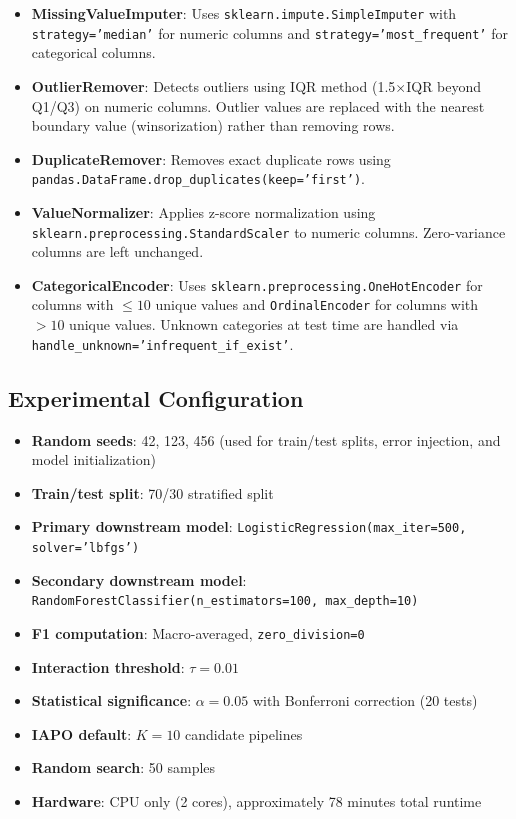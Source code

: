 \documentclass[preprint]{article}
\begin{document}
\begin{itemize}[nosep]
\item \textbf{MissingValueImputer}: Uses \texttt{sklearn.impute.SimpleImputer} with \texttt{strategy='median'} for numeric columns and \texttt{strategy='most\_frequent'} for categorical columns.
\item \textbf{OutlierRemover}: Detects outliers using IQR method (1.5$\times$IQR beyond Q1/Q3) on numeric columns. Outlier values are replaced with the nearest boundary value (winsorization) rather than removing rows.
\item \textbf{DuplicateRemover}: Removes exact duplicate rows using \texttt{pandas.DataFrame.drop\_duplicates(keep='first')}.
\item \textbf{ValueNormalizer}: Applies z-score normalization using \texttt{sklearn.preprocessing.StandardScaler} to numeric columns. Zero-variance columns are left unchanged.
\item \textbf{CategoricalEncoder}: Uses \texttt{sklearn.preprocessing.OneHotEncoder} for columns with $\leq 10$ unique values and \texttt{OrdinalEncoder} for columns with $> 10$ unique values. Unknown categories at test time are handled via \texttt{handle\_unknown='infrequent\_if\_exist'}.
\end{itemize}

\subsection{Experimental Configuration}

\begin{itemize}[nosep]
\item \textbf{Random seeds}: 42, 123, 456 (used for train/test splits, error injection, and model initialization)
\item \textbf{Train/test split}: 70/30 stratified split
\item \textbf{Primary downstream model}: \texttt{LogisticRegression(max\_iter=500, solver='lbfgs')}
\item \textbf{Secondary downstream model}: \texttt{RandomForestClassifier(n\_estimators=100, max\_depth=10)}
\item \textbf{F1 computation}: Macro-averaged, \texttt{zero\_division=0}
\item \textbf{Interaction threshold}: $\tau = 0.01$
\item \textbf{Statistical significance}: $\alpha = 0.05$ with Bonferroni correction (20 tests)
\item \textbf{IAPO default}: $K = 10$ candidate pipelines
\item \textbf{Random search}: 50 samples
\item \textbf{Hardware}: CPU only (2 cores), approximately 78 minutes total runtime
\end{itemize}
\end{document}
